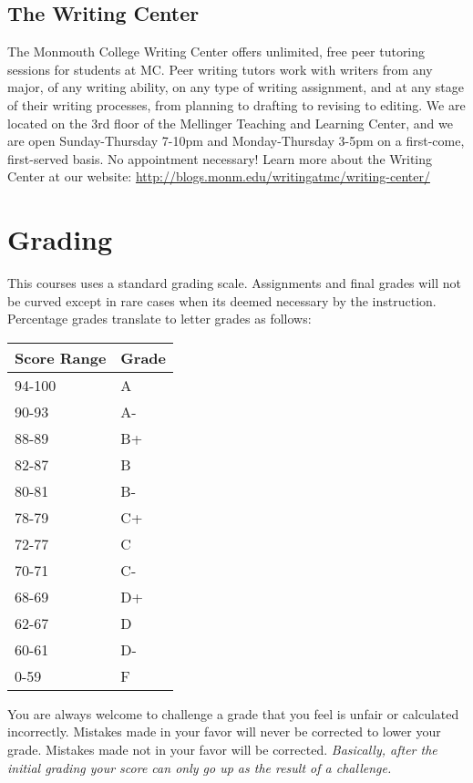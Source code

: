 \documentclass[]{tufte-handout}
\begin{document}
\subsection{The Writing Center}

The Monmouth College Writing Center offers unlimited, free peer tutoring sessions for students at MC.  Peer writing tutors work with writers from any major, of any writing ability, on any type of writing assignment, and at any stage of their writing processes, from planning to drafting to revising to editing.  We are located on the 3rd floor of the Mellinger Teaching and Learning Center, and we are open Sunday-Thursday 7-10pm and Monday-Thursday 3-5pm on a first-come, first-served basis.  No appointment necessary!  Learn more about the Writing Center at our website: \url{http://blogs.monm.edu/writingatmc/writing-center/}

\section{Grading}

This courses uses a standard grading scale.  Assignments and final grades will not be curved except in rare cases when its deemed necessary by the instruction.  Percentage grades translate to letter grades as follows:
\newline
\begin{center}
\begin{small}
\begin{tabular}{ll}
Score Range & Grade \\ \hline
94-100 & A \\
90-93 & A- \\
88-89 & B+ \\
82-87 & B \\
80-81 & B- \\
78-79 & C+ \\
72-77 & C \\
70-71 & C- \\
68-69 & D+ \\
62-67 & D \\
60-61 & D- \\
0-59 & F 
\end{tabular}
\end{small}
\end{center}


You are always welcome to challenge a grade that you feel is unfair or calculated incorrectly.  Mistakes made in your favor will never be corrected to lower your grade.  Mistakes made not in your favor will be corrected.  \textit{Basically, after the initial grading your score can only go up as the result of a challenge.}
\end{document}
